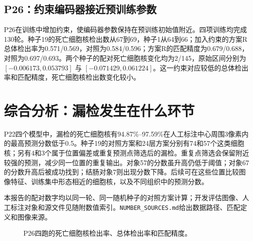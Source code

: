 \documentclass[UTF8,zihao=-4,fontset=windows]{ctexart}
\begin{document}
\subsection{P26：约束编码器接近预训练参数}
P26在训练中增加约束，使编码器参数保持在预训练初始值附近。四项训练均完成130轮。种子19的死亡细胞核检出数从67到69，种子1从64到66；加入约束的方案R总体检出率为0.571/0.569，对照为0.584/0.596；方案R的匹配精度为0.679/0.688，对照为0.697/0.693。两个种子的配对死亡细胞核变化均为2/145，原始区间分别为 $[-0.006173,0.053793]$ 与 $[-0.071429,0.061224]$。这一约束对应较低的总体检出率和匹配精度，死亡细胞核检出数变化较小。

\section{综合分析：漏检发生在什么环节}
P22四个模型中，漏检的死亡细胞核有94.87\%--97.59\%在人工标注中心周围3像素内的最高预测分数低于0.5。种子19的对照方案和24层方案分别有74和57个这类细胞核；另有4和3个属于位置偏差或重复预测点筛选后的漏检。重复点筛选会保留附近较强的预测，减少同一位置的重复输出。对象57的分数虽升高仍低于阈值；对象67的分数升高后被成功找到；结肠对象7则出现分数下降。后续可在这些位置比较图像特征、训练集中形态相近的细胞核，以及不同组织中的预测分数。

本报告的配对数字均以同一轮、同一随机种子的对照方案计算；开发评估图像、人工标注对象和源文件见随附数值索引。\texttt{NUMBER\_SOURCES.md}给出数据路径、匹配定义和图像来源。
\begin{figure}[H]\centering\caption{P26四跑的死亡细胞核检出率、总体检出率和匹配精度。}\end{figure}
\end{document}
